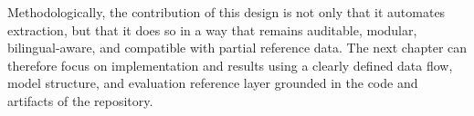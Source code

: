 Methodologically, the contribution of this design is not only that it automates extraction, but that it does so in a way that remains auditable, modular, bilingual-aware, and compatible with partial reference data. The next chapter can therefore focus on implementation and results using a clearly defined data flow, model structure, and evaluation reference layer grounded in the code and artifacts of the repository.





